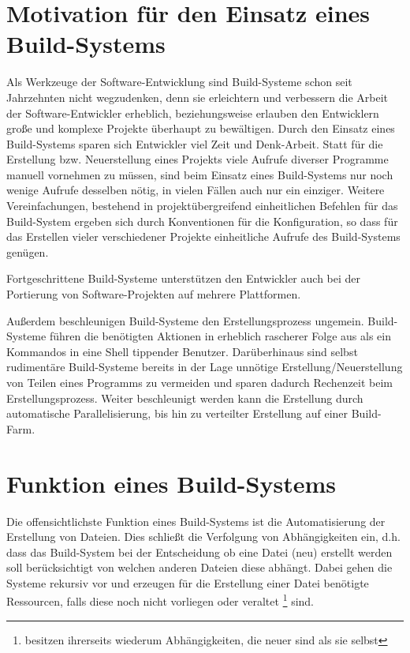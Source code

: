 \section{Motivation für den Einsatz eines Build-Systems} 

Als Werkzeuge der Software-Entwicklung sind Build-Systeme schon seit Jahrzehnten
nicht wegzudenken, denn sie erleichtern und verbessern die Arbeit der
Software-Entwickler erheblich, beziehungsweise erlauben den Entwicklern große
und komplexe Projekte überhaupt zu bewältigen. 
%
Durch den Einsatz eines Build-Systems sparen sich Entwickler viel Zeit und
Denk-Arbeit. Statt für die Erstellung bzw. Neuerstellung eines Projekts viele
Aufrufe diverser Programme manuell vornehmen zu müssen, sind beim Einsatz eines
Build-Systems nur noch wenige Aufrufe desselben nötig, in vielen Fällen auch
nur ein einziger.
%
Weitere Vereinfachungen, bestehend in projektübergreifend einheitlichen Befehlen
für das Build-System ergeben sich durch Konventionen für die Konfiguration, so
dass für das Erstellen vieler verschiedener Projekte einheitliche Aufrufe des
Build-Systems genügen.

Fortgeschrittene Build-Systeme unterstützen den Entwickler auch bei der
Portierung von Software-Projekten auf mehrere Plattformen. %

Außerdem beschleunigen Build-Systeme den Erstellungsprozess ungemein.
Build-Systeme führen die benötigten Aktionen in erheblich rascherer Folge aus
als ein Kommandos in eine Shell tippender Benutzer. 
%
Darüberhinaus sind selbst rudimentäre Build-Systeme bereits in der Lage unnötige
Erstellung/Neuerstellung von Teilen eines Programms zu vermeiden und sparen
dadurch Rechenzeit beim Erstellungsprozess.
%
Weiter beschleunigt werden kann die Erstellung durch automatische
Parallelisierung, bis hin zu verteilter Erstellung auf einer Build-Farm.

\section{Funktion eines Build-Systems}

Die offensichtlichste Funktion eines Build-Systems ist die Automatisierung der
Erstellung von Dateien. Dies schließt die Verfolgung von Abhängigkeiten ein,
d.h. dass das Build-System bei der Entscheidung ob eine Datei (neu) erstellt
werden soll berücksichtigt von welchen anderen Dateien diese abhängt.
%
Dabei gehen die Systeme rekursiv vor und erzeugen für die Erstellung einer Datei
benötigte Ressourcen, falls diese noch nicht vorliegen oder veraltet
\footnote{besitzen ihrerseits wiederum Abhängigkeiten, die neuer sind als sie
selbst} sind.

